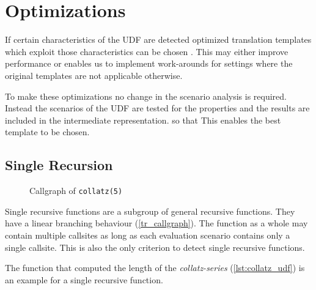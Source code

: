 \chapter{Optimizations}

If certain characteristics of the UDF are detected optimized translation templates which exploit those characteristics can be chosen . This may either improve performance or enables us to implement work-arounds for settings where the original templates are not applicable otherwise.

To make these optimizations no change in the scenario analysis is required. Instead the scenarios of the UDF are tested for the properties and the results are included in the intermediate representation. so that This enables the best template to be chosen.

\section{Single Recursion}

\begin{wrapfigure}{r}{0.2\textwidth}
  \vspace{-10pt}
  \centering
{}
  \vspace{-10pt}
  \caption{Callgraph of \texttt{collatz(5)}}
  \label{tr_callgraph}
\end{wrapfigure}

Single recursive functions are a subgroup of general recursive functions. They have a linear branching behaviour (\autoref{tr_callgraph}). The function as a whole may contain multiple callsites as long as each evaluation scenario contains only a single callsite. This is also the only criterion to detect single recursive functions.

The function that computed the length of the \textit{collatz-series} (\autoref{lst:collatz_udf}) is an example for a single recursive function.

